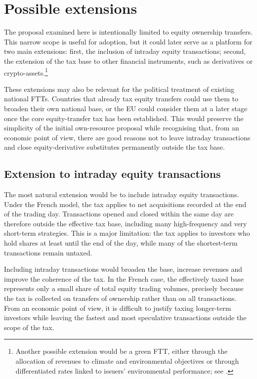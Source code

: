 \documentclass[../../main]{subfiles}
\begin{document}
\section{Possible extensions}

The proposal examined here is intentionally limited to equity ownership transfers. This narrow scope is useful for adoption, but it could later serve as a platform for two main extensions: first, the inclusion of intraday equity transactions; second, the extension of the tax base to other financial instruments, such as derivatives or crypto-assets.\footnote{Another possible extension would be a green FTT, either through the allocation of revenues to climate and environmental objectives or through differentiated rates linked to issuers' environmental performance; see \citep{CapelleBlancardGreenFTT}.}

These extensions may also be relevant for the political treatment of existing national FTTs. Countries that already tax equity transfers could use them to broaden their own national base, or the EU could consider them at a later stage once the core equity-transfer tax has been established. This would preserve the simplicity of the initial own-resource proposal while recognising that, from an economic point of view, there are good reasons not to leave intraday transactions and close equity-derivative substitutes permanently outside the tax base.

\subsection{Extension to intraday equity transactions}

The most natural extension would be to include intraday equity transactions. Under the French model, the tax applies to net acquisitions recorded at the end of the trading day. Transactions opened and closed within the same day are therefore outside the effective tax base, including many high-frequency and very short-term strategies. This is a major limitation: the tax applies to investors who hold shares at least until the end of the day, while many of the shortest-term transactions remain untaxed.

Including intraday transactions would broaden the base, increase revenues and improve the coherence of the tax. In the French case, the effectively taxed base represents only a small share of total equity trading volumes, precisely because the tax is collected on transfers of ownership rather than on all transactions. From an economic point of view, it is difficult to justify taxing longer-term investors while leaving the fastest and most speculative transactions outside the scope of the tax.
\end{document}

